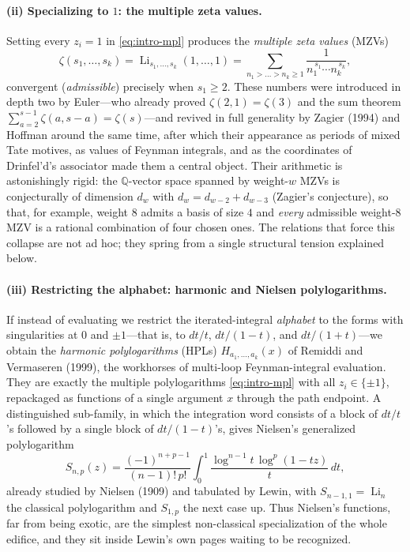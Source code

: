 \documentclass[11pt]{article}
\DeclareMathOperator{\Li}{Li}
\theoremstyle{plain}
\theoremstyle{remark}
\begin{document}
\paragraph{(ii) Specializing to $1$: the multiple zeta values.}
Setting every $z_i=1$ in \eqref{eq:intro-mpl} produces the \emph{multiple zeta
values} (MZVs)
\begin{equation}\label{eq:intro-mzv}
  \zeta(s_1,\dots,s_k)=\Li_{s_1,\dots,s_k}(1,\dots,1)
  =\sum_{n_1>\dots>n_k\ge1}\frac{1}{n_1^{\,s_1}\cdots n_k^{\,s_k}},
\end{equation}
convergent (\emph{admissible}) precisely when $s_1\ge2$. These numbers were
introduced in depth two by Euler—who already proved $\zeta(2,1)=\zeta(3)$ and the
sum theorem $\sum_{a=2}^{s-1}\zeta(a,s-a)=\zeta(s)$—and revived in full
generality by Zagier (1994) and Hoffman around the same time, after which their
appearance as periods of mixed Tate motives, as values of Feynman integrals, and
as the coordinates of Drinfel'd's associator made them a central object. Their
arithmetic is astonishingly rigid: the $\mathbb{Q}$-vector space spanned by
weight-$w$ MZVs is conjecturally of dimension $d_w$ with
$d_w=d_{w-2}+d_{w-3}$ (Zagier's conjecture), so that, for example, weight $8$
admits a basis of size $4$ and \emph{every} admissible weight-$8$ MZV is a
rational combination of four chosen ones. The relations that force this collapse
are not ad hoc; they spring from a single structural tension explained below.

\paragraph{(iii) Restricting the alphabet: harmonic and Nielsen polylogarithms.}
If instead of evaluating we restrict the iterated-integral \emph{alphabet} to the
forms with singularities at $0$ and $\pm1$—that is, to $dt/t$, $dt/(1-t)$, and
$dt/(1+t)$—we obtain the \emph{harmonic polylogarithms} (HPLs)
$H_{a_1,\dots,a_k}(x)$ of Remiddi and Vermaseren (1999), the workhorses of
multi-loop Feynman-integral evaluation. They are exactly the multiple
polylogarithms \eqref{eq:intro-mpl} with all $z_i\in\{\pm1\}$, repackaged as
functions of a single argument $x$ through the path endpoint. A distinguished
sub-family, in which the integration word consists of a block of $dt/t$'s followed
by a single block of $dt/(1-t)$'s, gives Nielsen's generalized polylogarithm
\begin{equation}\label{eq:intro-nielsen}
  S_{n,p}(z)=\frac{(-1)^{n+p-1}}{(n-1)!\,p!}\int_0^1\frac{\log^{n-1}t\,\log^{p}(1-tz)}{t}\,dt,
\end{equation}
already studied by Nielsen (1909) and tabulated by Lewin, with $S_{n-1,1}=\Li_n$
the classical polylogarithm and $S_{1,p}$ the next case up. Thus Nielsen's
functions, far from being exotic, are the simplest non-classical specialization of
the whole edifice, and they sit inside Lewin's own pages waiting to be recognized.
\end{document}
